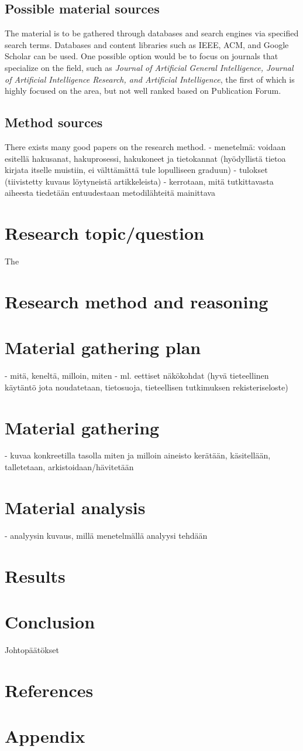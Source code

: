 \documentclass[utf8,english]{gradu3}
\begin{document}
\subsection{Possible material sources}
The material is to be gathered through databases and search engines via specified search terms. Databases and content libraries such as IEEE, ACM, and Google Scholar can be used. One possible option would be to focus on journals that specialize on the field, such as \textit{Journal of Artificial General Intelligence, Journal of Artificial Intelligence Research, and Artificial Intelligence}, the first of which is highly focused on the area, but not well ranked based on Publication Forum. 
\subsection{Method sources}
There exists many good papers on the research method. 
- menetelmä: voidaan esitellä hakusanat, hakuprosessi, hakukoneet ja tietokannat (hyödyllistä tietoa kirjata itselle muistiin, ei välttämättä tule lopulliseen graduun)
- tulokset (tiivistetty kuvaus löytyneistä artikkeleista)
- kerrotaan, mitä tutkittavasta aiheesta tiedetään entuudestaan
metodilähteitä mainittava
\section{Research topic/question}
The 
\section{Research method and reasoning}
\section{Material gathering plan}
- mitä, keneltä, milloin, miten
- ml. eettiset näkökohdat (hyvä tieteellinen käytäntö jota noudatetaan, tietosuoja, tieteellisen tutkimuksen rekisteriseloste)
\section{Material gathering}
- kuvaa konkreetilla tasolla miten ja milloin aineisto kerätään, käsitellään, talletetaan, arkistoidaan/hävitetään
\section{Material analysis}
- analyysin kuvaus, millä menetelmällä analyysi tehdään
\section{Results}
\section{Conclusion}
 Johtopäätökset
\section{References}
\section{Appendix}
\end{document}

